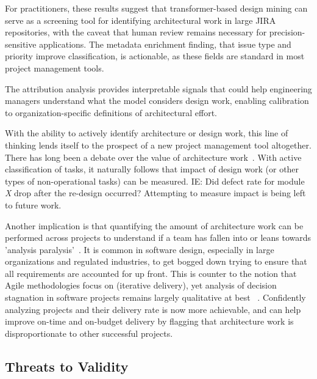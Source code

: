 \documentclass[preprint,12pt]{elsarticle}
\begin{document}
For practitioners, these results suggest that transformer-based design mining can serve as a screening tool for identifying architectural work in large JIRA repositories, with the caveat that human review remains necessary for precision-sensitive applications. The metadata enrichment finding, that issue type and priority improve classification, is actionable, as these fields are standard in most project management tools.

The attribution analysis provides interpretable signals that could help engineering managers understand what the model considers design work, enabling calibration to organization-specific definitions of architectural effort.

With the ability to actively identify architecture or design work, this line of thinking lends itself to the prospect of a new project management tool altogether. There has long been a debate over the value of architecture work~\cite{gong2019}. With active classification of tasks, it naturally follows that impact of design work (or other types of non-operational tasks) can be measured. IE: Did defect rate for module \emph{X} drop after the re-design occurred? Attempting to measure impact is being left to future work.

Another implication is that quantifying the amount of architecture work can be performed across projects to understand if a team has fallen into or leans towards 'analysis paralysis'~\cite{brown1998antipatterns}. It is common in software design, especially in large organizations and regulated industries, to get bogged down trying to ensure that all requirements are accounted for up front. This is counter to the notion that Agile methodologies focus on (iterative delivery), yet analysis of decision stagnation in software projects remains largely qualitative at best ~\cite{cao2008agile}. Confidently analyzing projects and their delivery rate is now more achievable, and can help improve on-time and on-budget delivery by flagging that architecture work is disproportionate to other successful projects. 

\subsection{Threats to Validity}
\label{sec:threats}
\end{document}
